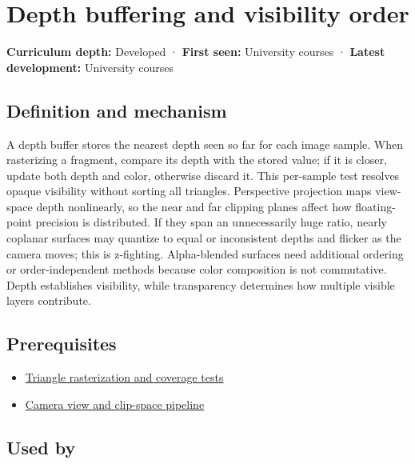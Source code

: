 \hypertarget{appendix-97578ed97952}{}\label{referencestart:appendix-97578ed97952}
\section{Depth buffering and visibility order}\label{appendix-97578ed97952-depth-buffering-and-visibility-order}

\textbf{Curriculum depth:} Developed · \textbf{First seen:} University courses · \textbf{Latest development:} University courses

\subsection{Definition and mechanism}\label{appendix-97578ed97952-definition-and-mechanism}

A depth buffer stores the nearest depth seen so far for each image sample. When rasterizing a fragment, compare its depth with the stored value; if it is closer, update both depth and color, otherwise discard it. This per-sample test resolves opaque visibility without sorting all triangles. Perspective projection maps view-space depth nonlinearly, so the near and far clipping planes affect how floating-point precision is distributed. If they span an unnecessarily huge ratio, nearly coplanar surfaces may quantize to equal or inconsistent depths and flicker as the camera moves; this is z-fighting. Alpha-blended surfaces need additional ordering or order-independent methods because color composition is not commutative. Depth establishes visibility, while transparency determines how multiple visible layers contribute.

\subsection{Prerequisites}\label{appendix-97578ed97952-prerequisites}

\begin{itemize}
\tightlist
\item
  \hyperref[appendix-ed3f9bc298fe]{Triangle rasterization and coverage tests}
\item
  \hyperref[appendix-1c07d64f5e70]{Camera view and clip-space pipeline}
\end{itemize}

\subsection{Used by}\label{appendix-97578ed97952-used-by}

